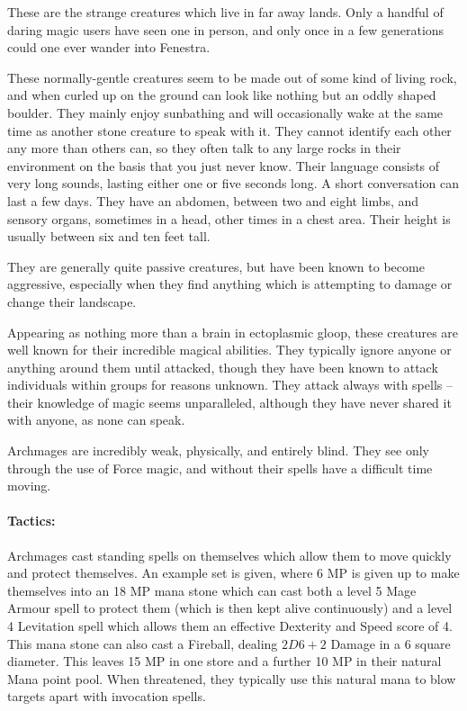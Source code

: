 \begin{multicols}{2}

These are the strange creatures which live in far away lands.  Only a handful of daring magic users have seen one in person, and only once in a few generations could one ever wander into Fenestra.

\label{rockman}

These normally-gentle creatures seem to be made out of some kind of living rock, and when curled up on the ground can look like nothing but an oddly shaped boulder.
They mainly enjoy sunbathing and will occasionally wake at the same time as another stone creature to speak with it.
They cannot identify each other any more than others can, so they often talk to any large rocks in their environment on the basis that you just never know.
Their language consists of very long sounds, lasting either one or five seconds long.
A short conversation can last a few days.
They have an abdomen, between two and eight limbs, and sensory organs, sometimes in a head, other times in a chest area.
Their height is usually between six and ten feet tall.

They are generally quite passive creatures, but have been known to become aggressive, especially when they find anything which is attempting to damage or change their landscape.

\rockman

\label{archmage}

Appearing as nothing more than a brain in ectoplasmic gloop, these creatures are well known for their incredible magical abilities.
They typically ignore anyone or anything around them until attacked, though they have been known to attack individuals within groups for reasons unknown.
They attack always with spells -- their knowledge of magic seems unparalleled, although they have never shared it with anyone, as none can speak.

Archmages are incredibly weak, physically, and entirely blind.
They see only through the use of Force magic, and without their spells have a difficult time moving.

\paragraph{Tactics:} Archmages cast standing spells on themselves which allow them to move quickly and protect themselves.
An example set is given, where 6 MP is given up to make themselves into an 18 MP mana stone which can cast both a level 5 Mage Armour spell to protect them (which is then kept alive continuously) and a level 4 Levitation spell which allows them an effective Dexterity and Speed score of 4.
This mana stone can also cast a Fireball, dealing $2D6+2$ Damage in a 6 square diameter.
This leaves 15 MP in one store and a further 10 MP in their natural Mana point pool.
When threatened, they typically use this natural mana to blow targets apart with invocation spells.


\end{multicols}
